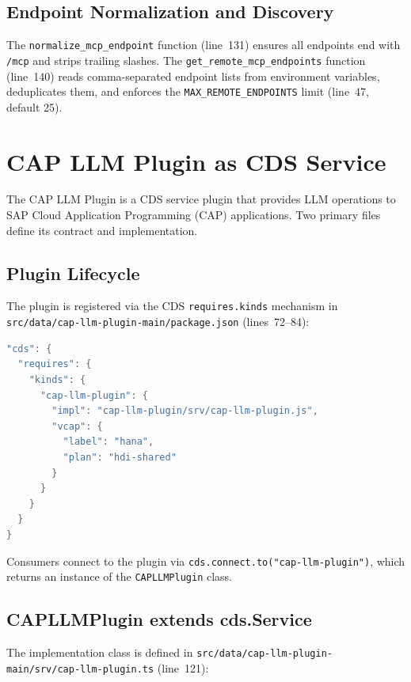 \documentclass[11pt]{article}
\newcommand{\filepath}[1]{\texttt{#1}}
\newcommand{\code}[1]{\texttt{#1}}
\begin{document}
\subsection{Endpoint Normalization and Discovery}

The \code{normalize\_mcp\_endpoint} function (line~131) ensures all endpoints
end with \code{/mcp} and strips trailing slashes.  The
\code{get\_remote\_mcp\_endpoints} function (line~140) reads comma-separated
endpoint lists from environment variables, deduplicates them, and enforces
the \code{MAX\_REMOTE\_ENDPOINTS} limit (line~47, default 25).


\section{CAP LLM Plugin as CDS Service}
\label{sec:cap-llm-plugin}

The CAP LLM Plugin is a CDS service plugin that provides LLM operations
to SAP Cloud Application Programming (CAP) applications.  Two primary
files define its contract and implementation.

\subsection{Plugin Lifecycle}

The plugin is registered via the CDS \code{requires.kinds} mechanism in
\filepath{src/data/cap-llm-plugin-main/package.json} (lines~72--84):

\begin{lstlisting}[language=Java,caption={CDS plugin registration (package.json lines 72--84)},label=lst:cds-kinds]
"cds": {
  "requires": {
    "kinds": {
      "cap-llm-plugin": {
        "impl": "cap-llm-plugin/srv/cap-llm-plugin.js",
        "vcap": {
          "label": "hana",
          "plan": "hdi-shared"
        }
      }
    }
  }
}
\end{lstlisting}

Consumers connect to the plugin via \code{cds.connect.to("cap-llm-plugin")},
which returns an instance of the \code{CAPLLMPlugin} class.

\subsection{CAPLLMPlugin extends cds.Service}

The implementation class is defined in
\filepath{src/data/cap-llm-plugin-main/srv/cap-llm-plugin.ts} (line~121):
\end{document}
